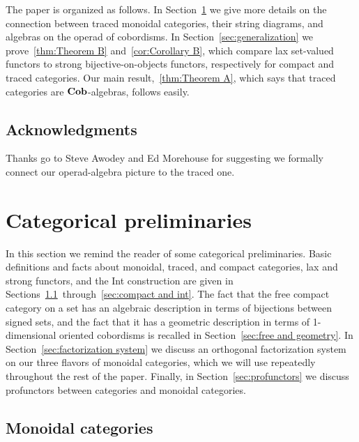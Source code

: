\documentclass[12pt,oneside,article,draft]{memoir}
\begin{document}
The paper is organized as follows.
In Section~\ref{sec:traced categories} we give more details on the connection between traced monoidal categories, their string diagrams, and algebras on the operad of cobordisms.
In Section~\ref{sec:generalization} we prove~\ref{thm:Theorem B} and~\ref{cor:Corollary B}, which compare lax set-valued functors to strong bijective-on-objects functors, respectively for compact and traced categories.
Our main result,~\ref{thm:Theorem A}, which says that traced categories are $\mathbf{Cob}$-algebras, follows easily.

\section*{Acknowledgments}

Thanks go to Steve Awodey and Ed Morehouse for suggesting we formally connect our operad-algebra picture to the traced one.


\chapter{Categorical preliminaries}\label{sec:traced categories}

In this section we remind the reader of some categorical preliminaries.
Basic definitions and facts about monoidal, traced, and compact categories, lax and strong functors, and the Int construction are given in Sections~\ref{sec:prelim monoidal}~through~\ref{sec:compact and int}.
The fact that the free compact category on a set has an algebraic description in terms of bijections between signed sets, and the fact that it has a geometric description in terms of 1-dimensional oriented cobordisms is recalled in Section~\ref{sec:free and geometry}.
In Section~\ref{sec:factorization system} we discuss an orthogonal factorization system on our three flavors of monoidal categories, which we will use repeatedly throughout the rest of the paper.
Finally, in Section~\ref{sec:profunctors} we discuss profunctors between categories and monoidal categories.


\section{Monoidal categories}\label{sec:prelim monoidal}
\end{document}

